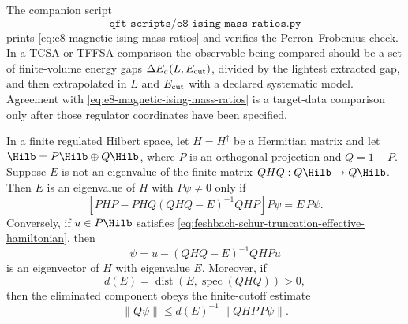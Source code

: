 The companion script
\[
  \texttt{qft\_scripts/e8\_ising\_mass\_ratios.py}
\]
prints \eqref{eq:e8-magnetic-ising-mass-ratios} and verifies the
Perron--Frobenius check.  In a TCSA or TFFSA comparison the observable
being compared should be a set of finite-volume energy gaps
\(\Delta E_a(L,E_{\rm cut})\), divided by the lightest extracted gap, and
then extrapolated in \(L\) and \(E_{\rm cut}\) with a declared systematic
model.  Agreement with \eqref{eq:e8-magnetic-ising-mass-ratios} is a
target-data comparison only after those regulator coordinates have been
specified.

\begin{lemma}
\label{lem:hamiltonian-truncation-schur-complement}
In a finite regulated Hilbert space, let \(H=H^\dagger\) be a Hermitian
matrix and let \(\Hilb=P\Hilb\oplus Q\Hilb\), where \(P\) is an orthogonal
projection and \(Q=1-P\).  Suppose \(E\) is not an eigenvalue of the
finite matrix \(QHQ:Q\Hilb\to Q\Hilb\).  Then \(E\) is an eigenvalue of
\(H\) with \(P\psi\ne0\) only if
\begin{equation}
  \left[
    PHP
    -
    PHQ(QHQ-E)^{-1}QHP
  \right]P\psi
  =
  E\,P\psi .
  \label{eq:feshbach-schur-truncation-effective-hamiltonian}
\end{equation}
Conversely, if \(u\in P\Hilb\) satisfies
\eqref{eq:feshbach-schur-truncation-effective-hamiltonian}, then
\[
  \psi
  =
  u
  -
  (QHQ-E)^{-1}QHPu
\]
is an eigenvector of \(H\) with eigenvalue \(E\).
Moreover, if
\[
  d(E)=\operatorname{dist}(E,\operatorname{spec}(QHQ))>0,
\]
then the eliminated component obeys the finite-cutoff estimate
\begin{equation}
  \|Q\psi\|
  \leq
  d(E)^{-1}\,\|QHP\,P\psi\|.
  \label{eq:feshbach-q-component-bound}
\end{equation}
\end{lemma}

